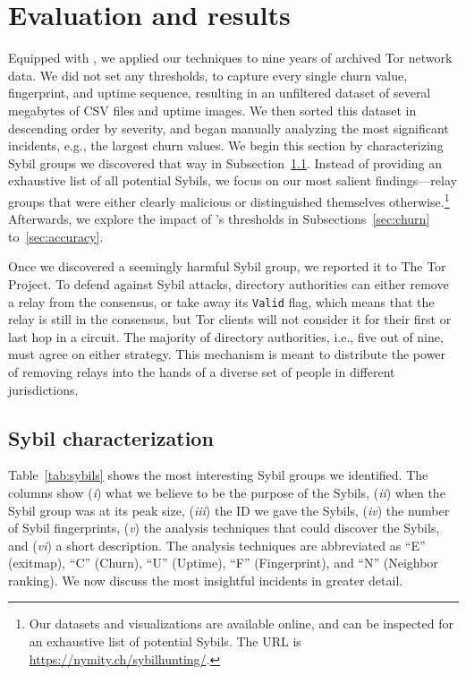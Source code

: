\section{Evaluation and results}
\label{sec:results}
Equipped with \sys, we applied our techniques to nine years of archived Tor
network data.  We did not set any thresholds, to capture every single churn
value, fingerprint, and uptime sequence, resulting in an unfiltered dataset of
several megabytes of CSV files and uptime images.  We then sorted this dataset
in descending order by severity, and began manually analyzing the most
significant incidents, e.g., the largest churn values.  We begin this section
by characterizing Sybil groups we discovered that way in
Subsection~\ref{sec:sybil_groups}.  Instead of providing an exhaustive list of
all potential Sybils, we focus on our most salient findings---relay groups that
were either clearly malicious or distinguished themselves
otherwise.\footnote{Our datasets and visualizations are available online, and
can be inspected for an exhaustive list of potential Sybils.  The URL is
\url{https://nymity.ch/sybilhunting/}.}  Afterwards, we explore the impact of
\sys's thresholds in Subsections~\ref{sec:churn} to~\ref{sec:accuracy}.

Once we discovered a seemingly harmful Sybil group, we reported it to The Tor
Project.  To defend against Sybil attacks, directory authorities can either
remove a relay from the consensus, or take away its \texttt{Valid} flag, which
means that the relay is still in the consensus, but Tor clients will not
consider it for their first or last hop in a circuit.  The majority of directory
authorities, i.e., five out of nine, must agree on either strategy.  This
mechanism is meant to distribute the power of removing relays into the hands of
a diverse set of people in different jurisdictions.

\subsection{Sybil characterization}
\label{sec:sybil_groups}
Table~\ref{tab:sybils} shows the most interesting Sybil groups we identified.
The columns show (\emph{i}) what we believe to be the purpose of the Sybils,
(\emph{ii}) when the Sybil group was at its peak size, (\emph{iii}) the ID we
gave the Sybils, (\emph{iv}) the number of Sybil fingerprints, (\emph{v}) the
analysis techniques that could discover the Sybils, and (\emph{vi}) a short
description.  The analysis techniques are abbreviated as ``E'' (exitmap), ``C''
(Churn), ``U'' (Uptime), ``F'' (Fingerprint), and ``N'' (Neighbor ranking).  We
now discuss the most insightful incidents in greater detail.

